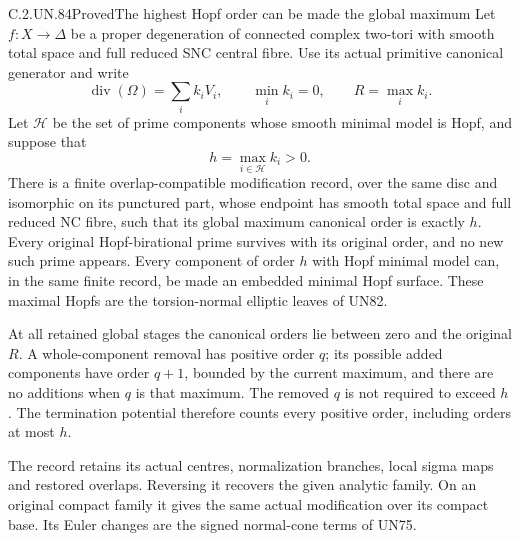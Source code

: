 \begin{statement}{C.2.UN.84}{Proved}{The highest Hopf order can be made the global maximum}
Let \(f:X\to\Delta\) be a proper degeneration of connected
complex two-tori with smooth total space and full reduced
SNC central fibre. Use its actual primitive canonical
generator and write
\[
 \operatorname{div}(\Omega)=\sum_i k_iV_i,\qquad
 \min_i k_i=0,\qquad R=\max_i k_i.
 \tag{C.TK.1}
\]
Let \(\mathcal H\) be the set of prime components whose
smooth minimal model is Hopf, and suppose that
\[
                  h=\max_{i\in\mathcal H}k_i>0.
 \tag{C.TK.2}
\]
There is a finite overlap-compatible modification record,
over the same disc and isomorphic on its punctured part,
whose endpoint has smooth total space and full reduced
NC fibre, such that its global maximum canonical order
is exactly \(h\). Every original Hopf-birational prime
survives with its original order, and no new such prime
appears. Every component of order \(h\) with Hopf minimal
model can, in the same finite record, be made an embedded
minimal Hopf surface. These maximal Hopfs are the
torsion-normal elliptic leaves of UN82.

At all retained global stages the canonical orders lie
between zero and the original \(R\). A whole-component
removal has positive order \(q\); its possible added
components have order \(q+1\), bounded by the current
maximum, and there are no additions when \(q\) is that
maximum. The removed \(q\) is not required to exceed
\(h\). The termination potential therefore counts every
positive order, including orders at most \(h\).

The record retains its actual centres, normalization
branches, local sigma maps and restored overlaps.
Reversing it recovers the given analytic family. On
an original compact family it gives the same actual
modification over its compact base. Its Euler changes
are the signed normal-cone terms of UN75.
\end{statement}

